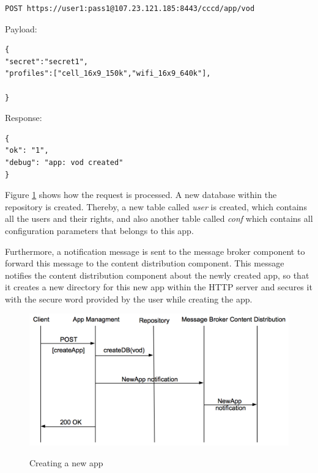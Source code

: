 \begin{code}
\begin{verbatim}
POST https://user1:pass1@107.23.121.185:8443/cccd/app/vod
\end{verbatim}
Payload:
\begin{verbatim}
{
"secret":"secret1",
"profiles":["cell_16x9_150k","wifi_16x9_640k"],

}
\end{verbatim}
Response:
\begin{verbatim}
{
"ok": "1",
"debug": "app: vod created"
}
\end{verbatim}
\end{code}
 
Figure \ref{fig:newApp} shows how the request is processed. A new database within the repository is created. Thereby, a new table called \textit{user} is created, which contains all the users and their rights, and also another table called \textit{conf} which contains all configuration parameters that belongs to this app.

Furthermore, a notification message is sent to the message broker component to forward this message to the content distribution component. This message notifies the content distribution component about the newly created app, so that it creates a new directory for this new app within the HTTP server and secures it with the secure word provided by the user while creating the app.

\begin{figure}[htb]
  \centering
  \includegraphics[scale=0.6]{flows/newAppFlow.png}\\
  \caption{Creating a new app}
  \label{fig:newApp}
\end{figure}

